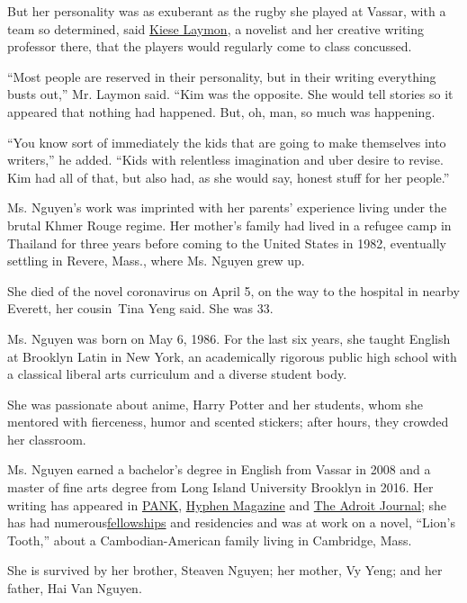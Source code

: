 But her personality was as exuberant as the rugby she played at Vassar,
with a team so determined, said \href{https://www.kieselaymon.com}{Kiese
Laymon}, a novelist and her creative writing professor there, that the
players would regularly come to class concussed.

``Most people are reserved in their personality, but in their writing
everything busts out,'' Mr. Laymon said. ``Kim was the opposite. She
would tell stories so it appeared that nothing had happened. But, oh,
man, so much was happening.

``You know sort of immediately the kids that are going to make
themselves into writers,'' he added. ``Kids with relentless imagination
and uber desire to revise. Kim had all of that, but also had, as she
would say, honest stuff for her people.''

Ms. Nguyen's work was imprinted with her parents' experience living
under the brutal Khmer Rouge regime. Her mother's family had lived in a
refugee camp in Thailand for three years before coming to the United
States in 1982, eventually settling in Revere, Mass., where Ms. Nguyen
grew up.

She died of the novel coronavirus on April 5, on the way to the hospital
in nearby Everett, her cousin~Tina Yeng said. She was 33.

Ms. Nguyen was born on May 6, 1986. For the last six years, she taught
English at Brooklyn Latin in New York, an academically rigorous public
high school with a classical liberal arts curriculum and a diverse
student body.

She was passionate about anime, Harry Potter and her students, whom she
mentored with fierceness, humor and scented stickers; after hours, they
crowded her classroom.

Ms. Nguyen earned a bachelor's degree in English from Vassar in 2008 and
a master of fine arts degree from Long Island University Brooklyn in
2016. Her writing has appeared in
\href{https://pankmagazine.com/piece/these-things-and-how-they-go/}{PANK},
\href{https://hyphenmagazine.com/blog/2014/9/9/september-lit-ear-sky-kimarlee-nguyen}{Hyphen
Magazine} and \href{https://theadroitjournal.org}{The Adroit Journal};
she has had
numerous\href{http://www.kundiman.org/announcements/remembering-kimarlee-nguyen}{fellowships}
and residencies and was at work on a novel, ``Lion's Tooth,'' about a
Cambodian-American family living in Cambridge, Mass.

She is survived by her brother, Steaven Nguyen; her mother, Vy Yeng; and
her father, Hai Van Nguyen.


